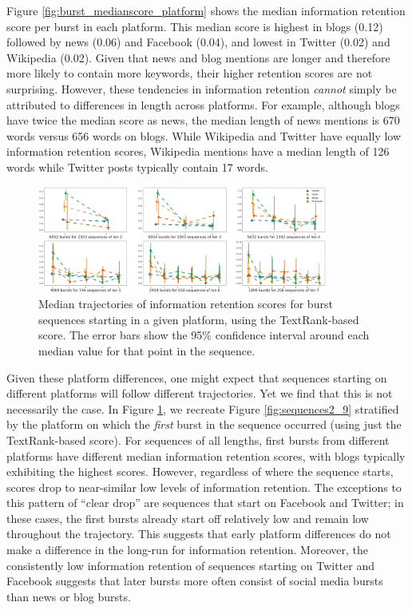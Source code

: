 \documentclass[letterpaper]{article} %
\begin{document}
Figure \ref{fig:burst_medianscore_platform} shows the median information retention score per burst in each platform. This median score is highest in blogs (0.12) followed by news (0.06) and Facebook (0.04), and lowest in Twitter (0.02) and Wikipedia (0.02). Given that news and blog mentions are longer and therefore more likely to contain more keywords, their higher retention scores are not surprising. However, these tendencies in information retention \emph{cannot} simply be attributed to differences in length across platforms. For example, although blogs have twice the median score as news, the median length of news mentions is 670 words versus 656 words on blogs. While Wikipedia and Twitter have equally low information retention scores, Wikipedia mentions have a median length of 126 words while Twitter posts typically contain 17 words.

\begin{figure}[t]
    \centering
    \includegraphics[width=0.85\textwidth]{figs/trajectory_platform.png}
    \caption{Median trajectories of information retention scores for burst sequences starting in a given platform, using the TextRank-based score. The error bars show the 95\% confidence interval around each median value for that point in the sequence.}
    \label{fig:sequences2_9_first}
\end{figure}

Given these platform differences, one might expect that sequences starting on different platforms will follow different trajectories. Yet we find that this is not necessarily the case. In Figure \ref{fig:sequences2_9_first}, we recreate Figure \ref{fig:sequences2_9} stratified by the platform on which the \textit{first} burst in the sequence occurred (using just the TextRank-based score). For sequences of all lengths, first bursts from different platforms have different median information retention scores, with blogs typically exhibiting the highest scores. However, regardless of where the sequence starts, scores drop to near-similar low levels of information retention. The exceptions to this pattern of ``clear drop'' are sequences that start on Facebook and Twitter; in these cases, the first bursts already start off relatively low and remain low throughout the trajectory.
This suggests that early platform differences do not make a difference in the long-run for information retention. Moreover, the consistently low information retention of sequences starting on Twitter and Facebook suggests that later bursts more often consist of social media bursts than news or blog bursts.
\end{document}
